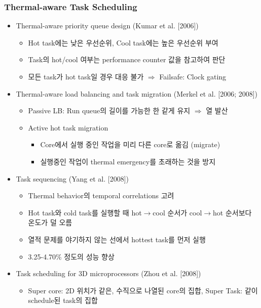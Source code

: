 \subsubsection*{Thermal-aware Task Scheduling}
\begin{itemize}
    \item Thermal-aware priority queue design (Kumar et al. [2006])
    \begin{itemize}
        \item Hot task에는 낮은 우선순위, Cool task에는 높은 우선순위 부여
        \item Task의 hot/cool 여부는 performance counter 값을 참고하여 판단
        \item 모든 task가 hot task일 경우 대응 불가 $\Rightarrow$ Failsafe: Clock gating
    \end{itemize}
    \item Thermal-aware load balancing and task migration (Merkel et al. [2006; 2008])
    \begin{itemize}
        \item Passive LB: Run queue의 길이를 가능한 한 같게 유지 $\Rightarrow$ 열 발산
        \item Active hot task migration
        \begin{itemize}
            \item Core에서 실행 중인 작업을 미리 다른 core로 옮김 (migrate)
            \item 실행중인 작업이 thermal emergency를 초래하는 것을 방지
        \end{itemize}
    \end{itemize}
    \item Task sequencing (Yang et al. [2008])
    \begin{itemize}
        \item Thermal behavior의 temporal correlations 고려
        \item Hot task와 cold task를 실행할 때 hot$\rightarrow$cool 순서가 cool$\rightarrow$hot 순서보다 온도가 덜 오름
        \item 열적 문제를 야기하지 않는 선에서 hottest task를 먼저 실행
        \item 3.25-4.70\% 정도의 성능 향상
    \end{itemize}
    \item Task scheduling for 3D microprocessors (Zhou et al. [2008])
    \begin{itemize}
        \item Super core: 2D 위치가 같은, 수직으로 나열된 core의 집합, Super Task: 같이 schedule된 task의 집합

\end{itemize}
\end{itemize}
